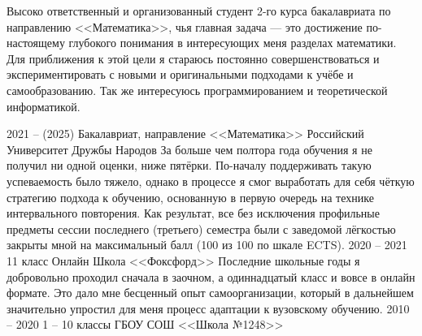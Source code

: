 \documentclass[9pt]{developercv} %
\begin{document}

\begin{minipage}[t]{0.4\textwidth} %
    Высоко ответственный и организованный студент 2-го курса бакалавриата по направлению <<Математика>>, чья главная задача --- это достижение по-настоящему глубокого понимания в интересующих меня разделах математики. Для приближения к этой цели я стараюсь постоянно совершенствоваться и экспериментировать с новыми и оригинальными подходами к учёбе и самообразованию. Так же интересуюсь программированием и теоретической информатикой.
\end{minipage}
\hfill %
\begin{minipage}[t]{0.5\textwidth} %
	\vspace{-\baselineskip} %
	\begin{barchart}{5.5}
	\end{barchart}
\end{minipage}



\begin{entrylist}
	\entry
		{2021 -- (2025)}
		{Бакалавриат, направление <<Математика>>}
		{Российский Университет Дружбы Народов}
		{За больше чем полтора года обучения я не получил ни одной оценки, ниже пятёрки. По-началу поддерживать такую успеваемость было тяжело, однако в процессе я смог выработать для себя чёткую стратегию подхода к обучению, основанную в первую очередь на технике интервального повторения. Как результат, все без исключения профильные предметы сессии последнего (третьего) семестра были с заведомой лёгкостью закрыты мной на максимальный балл (100 из 100 по шкале ECTS).}
    \entry
        {2020 -- 2021}
        {11 класс}
        {Онлайн Школа <<Фоксфорд>>}
        {Последние школьные годы я добровольно проходил сначала в заочном, а одиннадцатый класс и вовсе в онлайн формате. Это дало мне бесценный опыт самоорганизации, который в дальнейшем значительно упростил для меня процесс адаптации к вузовскому обучению.}
    \entry
        {2010 -- 2020}
        {1 -- 10 классы}
        {ГБОУ СОШ <<Школа №1248>>}
        {}
\end{entrylist}
\end{document}
